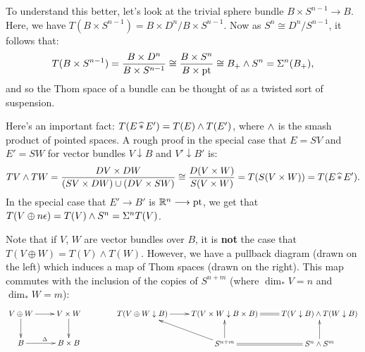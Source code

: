 To understand this better, let's look at the trivial sphere bundle $B \times S^{n-1} \to B$.  Here, we have $T(B \times S^{n-1}) = B \times D^n / B \times S^{n-1}$.  Now as $S^n\cong D^n/S^{n-1}$, it follows that:
\[T(B \times S^{n-1}) = \frac{B \times D^n}{B \times S^{n-1}} \cong \frac{B \times S^n}{B \times \mathrm{pt}} \cong B_+ \wedge S^n = \Sigma^n(B_+),\]
and so the Thom space of a bundle can be thought of as a twisted sort of suspension.

Here's an important fact: $T(E\, \widehat \ast\, E') = T(E) \wedge T(E')$, where $\wedge$ is the smash product of pointed spaces.  A rough proof in the special case that $E = SV$ and $E' = SW$ for vector bundles $V\downarrow B$ and $V'\downarrow B'$ is:
\[TV \wedge TW = \frac{DV \times DW}{(SV \times DW) \cup (DV \times SW)}\cong \frac{D(V \times W)}{S(V \times W)}= T(S(V \times W)) = T(E\,\widehat \ast\, E').\]
In the special case that $E' \to B'$ is $\mathbb{R}^n \longrightarrow \mathrm{pt}$, we get that $T(V \oplus n \epsilon) = T(V) \wedge S^n = \Sigma^n T(V)$.

Note that if $V$, $W$ are vector bundles over $B$, it is \textbf{not} the case that $T(V\oplus W)=T(V)\wedge T(W)$. However, we have a pullback diagram (drawn on the left) which induces a map of Thom spaces (drawn on the right). This map commutes with the inclusion of the copies of $S^{n+m}$ (where $\dim_*V=n$ and $\dim_*W=m$):
\[\xymatrix{
V\oplus W\ar[d]\ar[r]&V\times W\ar[d]\\
B\ar[r]^\Delta&B\times B
}\qquad\qquad
\xymatrix{
T(V\oplus W\downarrow B)\ar[r]&T(V\times W\downarrow B\times B)
\ar@{=}[r]&T(V\downarrow B)\wedge T(W\downarrow B)\\
&S^{n+m}\ar[ul]\ar[u]\ar@{=}[r]&S^n\wedge S^{m}\ar[u]
}\]

